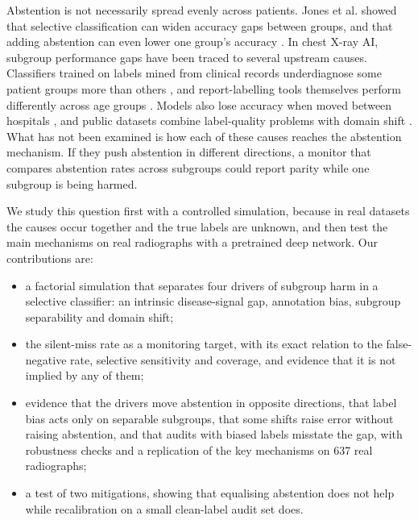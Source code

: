 \documentclass[conference]{IEEEtran}
\begin{document}
Abstention is not necessarily spread evenly across patients. Jones et al. showed that selective classification can widen accuracy gaps between groups, and that adding abstention can even lower one group's accuracy \cite{jones2021}. In chest X-ray AI, subgroup performance gaps have been traced to several upstream causes. Classifiers trained on labels mined from clinical records underdiagnose some patient groups more than others \cite{seyyedkalantari2021}, and report-labelling tools themselves perform differently across age groups \cite{santomartino2024}. Models also lose accuracy when moved between hospitals \cite{zech2018}, and public datasets combine label-quality problems with domain shift \cite{rafferty2025}. What has not been examined is how each of these causes reaches the abstention mechanism. If they push abstention in different directions, a monitor that compares abstention rates across subgroups could report parity while one subgroup is being harmed.

We study this question first with a controlled simulation, because in real datasets the causes occur together and the true labels are unknown, and then test the main mechanisms on real radiographs with a pretrained deep network. Our contributions are:
\begin{itemize}
\item a factorial simulation that separates four drivers of subgroup harm in a selective classifier: an intrinsic disease-signal gap, annotation bias, subgroup separability and domain shift;
\item the silent-miss rate as a monitoring target, with its exact relation to the false-negative rate, selective sensitivity and coverage, and evidence that it is not implied by any of them;
\item evidence that the drivers move abstention in opposite directions, that label bias acts only on separable subgroups, that some shifts raise error without raising abstention, and that audits with biased labels misstate the gap, with robustness checks and a replication of the key mechanisms on 637 real radiographs;
\item a test of two mitigations, showing that equalising abstention does not help while recalibration on a small clean-label audit set does.
\end{itemize}



\end{document}
